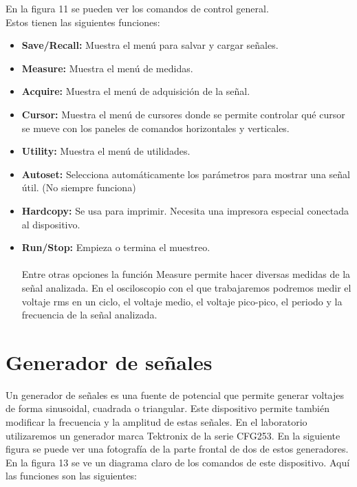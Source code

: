 \documentclass{scrartcl}
\begin{document}
En la figura 11 se pueden ver los comandos de control general. \\


Estos tienen las siguientes funciones:

\begin{itemize}
	\item \textbf{Save/Recall:} Muestra el menú para salvar y cargar señales.
	\item \textbf{Measure:} Muestra el menú de medidas.
	\item \textbf{Acquire:} Muestra el menú de adquisición de la señal.
	\item \textbf{Cursor:} Muestra el menú de cursores donde se permite controlar qué cursor se mueve con los paneles de comandos horizontales y verticales.
	\item \textbf{Utility:} Muestra el menú de utilidades.
	\item \textbf{Autoset:} Selecciona automáticamente los parámetros para mostrar una señal útil. (No siempre funciona)
	\item \textbf{Hardcopy:} Se usa para imprimir. Necesita una impresora especial conectada al dispositivo.
	\item \textbf{Run/Stop:} Empieza o termina el muestreo.\\
\\
Entre otras opciones la función Measure permite hacer diversas medidas de la señal analizada. En el osciloscopio con el que trabajaremos podremos medir el voltaje rms en un ciclo, el voltaje medio, el voltaje pico-pico, el periodo y la frecuencia de la señal analizada.

\end{itemize}


\section{Generador de señales}
Un generador de señales es una fuente de potencial que permite generar voltajes de forma sinusoidal, cuadrada o triangular. Este dispositivo permite también modificar la frecuencia y la amplitud de estas señales. En el laboratorio utilizaremos un generador marca Tektronix de la serie CFG253. En la siguiente figura se puede ver una fotografía de la parte frontal de dos de estos generadores.\\

En la figura 13 se ve un diagrama claro de los comandos de este dispositivo. Aquí las funciones son las siguientes:
\end{document}
